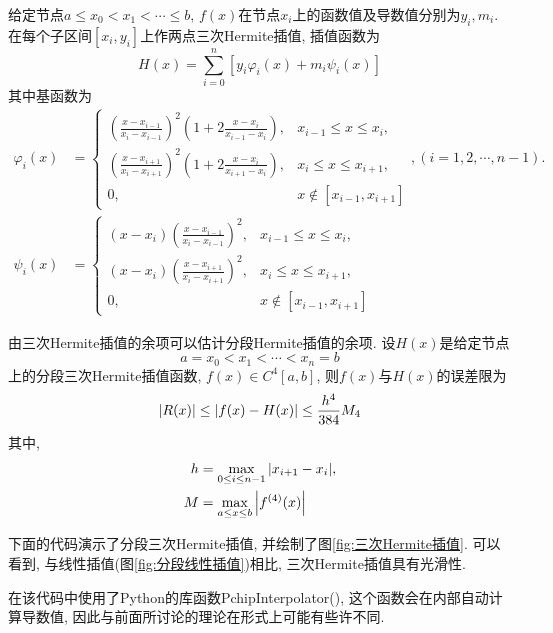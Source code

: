 给定节点$a\le x_0<x_1<\cdots\le b$, $f(x)$在节点$x_i$上的函数值及导数值分别为$y_i,m_i$. 在每个子区间$[x_i,y_i]$上作两点三次Hermite插值, 插值函数为
\begin{equation*}
    H(x)=\sum_{i=0}^n\left[y_i\varphi_i(x)+m_i\psi_i(x)\right]
\end{equation*}
其中基函数为
\begin{align*}
    \varphi_i(x)&=
    \begin{cases}
        \left(\frac{x-x_{i-1}}{x_i-x_{i-1}}\right)^2\left(1+2\frac{x-x_i}{x_{i-1}-x_i}\right),&x_{i-1}\le x\le x_i,\\
        \left(\frac{x-x_{i+1}}{x_i-x_{i+1}}\right)^2\left(1+2\frac{x-x_i}{x_{i+1}-x_i}\right),&x_i\le x\le x_{i+1},\\
        0,&x\notin[x_{i-1},x_{i+1}]
    \end{cases}, (i=1,2,\cdots,n-1).\\
    \psi_i(x)&=
    \begin{cases}
        (x-x_i)\left(\frac{x-x_{i-1}}{x_i-x_{i-1}}\right)^2,&x_{i-1}\le x\le x_i,\\
        (x-x_i)\left(\frac{x-x_{i+1}}{x_i-x_{i+1}}\right)^2,&x_{i}\le x\le x_{i+1},\\
        0,&x\notin[x_{i-1},x_{i+1}]
    \end{cases}
\end{align*}

由三次Hermite插值的余项可以估计分段Hermite插值的余项. 设$H(x)$是给定节点
\begin{equation*}
    a=x_0<x_1<\cdots<x_n=b
\end{equation*}
上的分段三次Hermite插值函数, $f(x)\in C^4[a,b]$, 则$f(x)$与$H(x)$的误差限为
\begin{equation*}
    \abs{R(x)}\le\abs{f(x)-H(x)}\le\frac{h^4}{384}M_4
\end{equation*}
其中,
\begin{align*}
    h&=\max_{0\le i\le n-1}\abs{x_{i+1}-x_i},\\
    M&=\max_{a\le x\le b}\abs{f^{(4)}(x)}
\end{align*}

下面的代码演示了分段三次Hermite插值, 并绘制了图\ref{fig:三次Hermite插值}. 可以看到, 与线性插值(图\ref{fig:分段线性插值})相比, 三次Hermite插值具有光滑性.

\begin{extend}
    在该代码中使用了Python的库函数PchipInterpolator(), 这个函数会在内部自动计算导数值, 因此与前面所讨论的理论在形式上可能有些许不同.
\end{extend}

